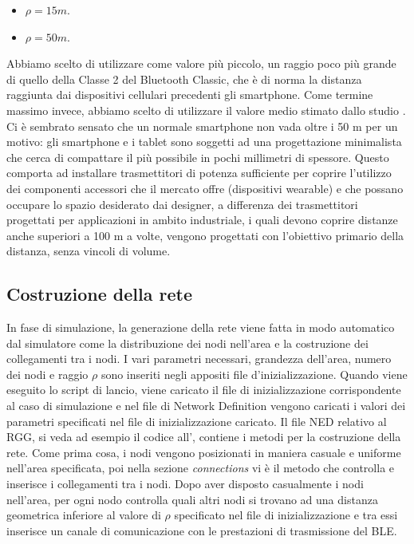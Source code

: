 \begin{itemize}
	\item $\rho = 15 m$.
	\item $\rho = 50 m$.
\end{itemize}
Abbiamo scelto di utilizzare come valore più piccolo, un raggio poco più grande di quello della Classe 2 del Bluetooth Classic, che è di norma la distanza raggiunta dai dispositivi cellulari precedenti gli smartphone. Come termine massimo invece, abbiamo scelto di utilizzare il valore medio stimato dallo studio \cite{tesi_tibertoa2013}. Ci è sembrato sensato che un normale smartphone non vada oltre i 50 m per un motivo: gli smartphone e i tablet sono soggetti ad una progettazione minimalista che cerca di compattare il più possibile in pochi millimetri di spessore. Questo comporta ad installare trasmettitori di potenza sufficiente per coprire l'utilizzo dei componenti accessori che il mercato offre (dispositivi wearable) e che possano occupare lo spazio desiderato dai designer, a differenza dei trasmettitori progettati per applicazioni in ambito industriale, i quali devono coprire distanze anche superiori a 100 m a volte, vengono progettati con l'obiettivo primario della distanza, senza vincoli di volume.

\subsection{Costruzione della rete}
In fase di simulazione, la generazione della rete viene fatta in modo automatico dal simulatore come la distribuzione dei nodi nell'area e la costruzione dei collegamenti tra i nodi. I vari parametri necessari, grandezza dell'area, numero dei nodi e raggio $\rho$ sono inseriti negli appositi file d'inizializzazione. Quando viene eseguito lo script di lancio, viene caricato il file di inizializzazione corrispondente al caso di simulazione e nel file di Network Definition vengono caricati i valori dei parametri specificati nel file di inizializzazione caricato. Il file \acs{NED} relativo al \acs{RGG}, si veda ad esempio il codice all', contiene i metodi per la costruzione della rete. Come prima cosa, i nodi vengono posizionati in maniera casuale e uniforme nell'area specificata, poi nella sezione \textit{connections} vi è il metodo che controlla e inserisce i collegamenti tra i nodi. Dopo aver disposto casualmente i nodi nell'area, per ogni nodo controlla quali altri nodi si trovano ad una distanza geometrica inferiore al valore di $\rho$ specificato nel file di inizializzazione e tra essi inserisce un canale di comunicazione con le prestazioni di trasmissione del BLE.

